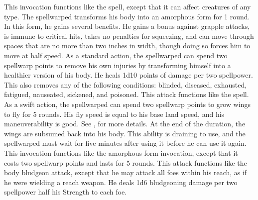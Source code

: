 This invocation functions like the 
spell, except that it can affect creatures of any type.
The spellwarped transforms his body into an amorphous form for 1 round.
In this form, he gains several benefits.
He gains a  bonus against grapple attacks, is immune to critical hits, takes no penalties for squeezing, and can move through spaces that are no more than two inches in width, though doing so forces him to move at half speed.
As a standard action, the spellwarped can spend two spellwarp points to remove his own injuries by transforming himself into a healthier version of his body.
He heals 1d10 points of damage per two spellpower.
This also removes any of the following conditions: blinded, diseased, exhausted, fatigued, nauseated, sickened, and poisoned.
 This attack functions like the 
spell.
As a swift action, the spellwarped can spend two spellwarp points to grow wings to fly for 5 rounds.
His fly speed is equal to his base land speed, and his maneuverability is good.
See , for more details.
At the end of the duration, the wings are subsumed back into his body.
This ability is draining to use, and the spellwarped must wait for five minutes after using it before he can use it again.
This invocation functions like the amorphous form invocation, except that it costs two spellwarp points and lasts for 5 rounds.
This attack functions like the body bludgeon attack, except that he may attack all foes within his reach, as if he were wielding a reach weapon.
He deals 1d6 bludgeoning damage per two spellpower \add half his Strength to each foe.

